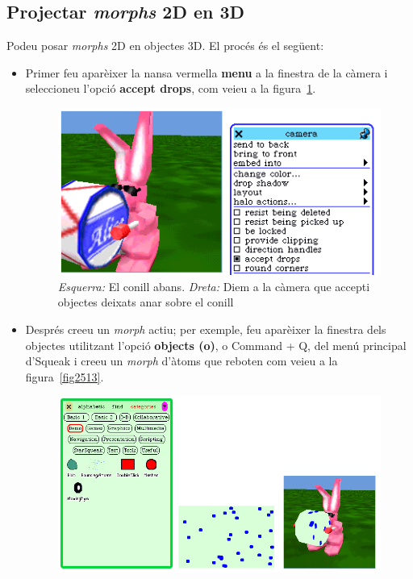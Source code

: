 \subsection{Projectar \emph{morphs} 2D en 3D}
Podeu posar \emph{morphs} 2D en objectes 3D. El procés és el següent:
\begin{itemize}
\item Primer feu aparèixer la nansa vermella \textbf{menu} a la finestra de la càmera i seleccioneu l'opció \textbf{accept drops}, com veieu a la figura~\ref{fig2512}.
\begin{figure}[h!]
\begin{center}
\includegraphics[scale=0.65]{Imatges/figura25-12}
\end{center}
\caption{\emph{Esquerra:} El conill abans.
\emph{Dreta:} Diem a la càmera que accepti objectes deixats anar sobre el conill}
\label{fig2512}
\end{figure}
\item Després creeu un \emph{morph} actiu; per exemple, feu aparèixer la finestra dels objectes utilitzant l'opció \textbf{objects (o)}, o \textsf{Command + Q}, del menú principal d'Squeak i creeu un \emph{morph} d'àtoms que reboten com veieu a la figura~\ref{fig2513}.
\begin{figure}[h!]
\begin{center}
\includegraphics[scale=0.5]{Imatges/figura25-13}

\end{center}
\end{figure}
\end{itemize}
